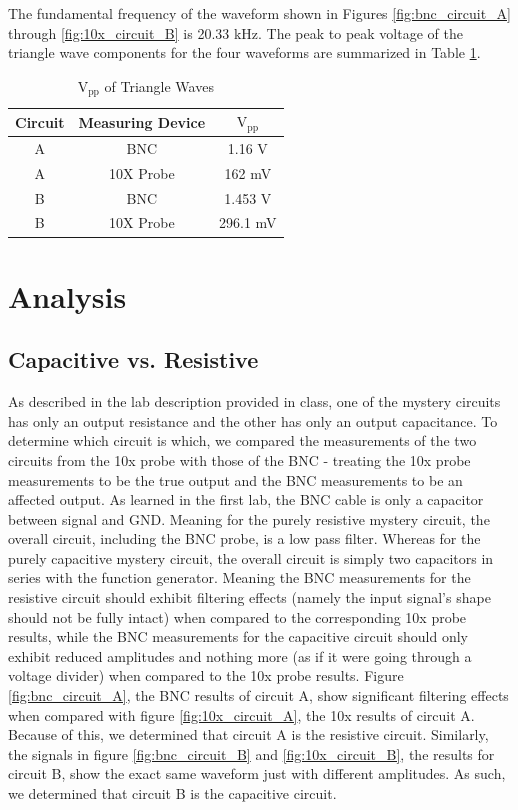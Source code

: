 \documentclass[12pt,letterpaper]{report}
\begin{document}
The fundamental frequency of the waveform shown in Figures \ref{fig:bnc_circuit_A} through \ref{fig:10x_circuit_B} is 20.33 kHz. The peak to peak voltage of the triangle wave components for the four waveforms are summarized in Table \ref{table:vpp}.

\begin{table}[ht]
\caption{$\text{V}_{\text{pp}}$ of Triangle Waves} %
\centering 
    \begin{tabular}{| c | c | c |}
    \hline  
    Circuit & Measuring Device & $\text{V}_{\text{pp}}$ \\
    \hline
    A & BNC & 1.16 V \\
    A & 10X Probe & 162 mV \\
    B & BNC & 1.453 V \\
    B & 10X Probe & 296.1 mV \\
    \hline
    \end{tabular}
    \label{table:vpp}
\end{table}

\section*{Analysis}

\subsection*{Capacitive vs. Resistive}
As described in the lab description provided in class, one of the mystery circuits has only an output resistance and the other has only an output capacitance. To determine which circuit is which, we compared the measurements of the two circuits from the 10x probe with those of the BNC - treating the 10x probe measurements to be the true output and the BNC measurements to be an affected output. As learned in the first lab, the BNC cable is only a capacitor between signal and GND. Meaning for the purely resistive mystery circuit, the overall circuit, including the BNC probe, is a low pass filter. Whereas for the purely capacitive mystery circuit, the overall circuit is simply two capacitors in series with the function generator. Meaning the BNC measurements for the resistive circuit should exhibit filtering effects (namely the input signal's shape should not be fully intact) when compared to the corresponding 10x probe results, while the BNC measurements for the capacitive circuit should only exhibit reduced amplitudes and nothing more (as if it were going through a voltage divider) when compared to the 10x probe results. Figure \ref{fig:bnc_circuit_A}, the BNC results of circuit A, show significant filtering effects when compared with figure \ref{fig:10x_circuit_A}, the 10x results of circuit A. Because of this, we determined that circuit A is the resistive circuit. Similarly, the signals in figure \ref{fig:bnc_circuit_B} and \ref{fig:10x_circuit_B}, the results for circuit B, show the exact same waveform just with different amplitudes. As such, we determined that circuit B is the capacitive circuit.
\end{document}
